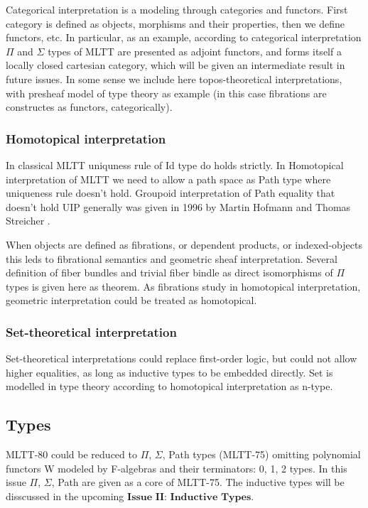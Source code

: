\documentclass{article}
\theoremstyle{definition}
\begin{document}
Categorical interpretation \cite{Curien14} is a modeling through categories and functors.
First category is defined as objects, morphisms and their properties, then
we define functors, etc. In particular, as an example, according to categorical
interpretation $\Pi$ and $\Sigma$ types of MLTT are presented as adjoint
functors, and forms itself a locally closed cartesian category, which will be given an
intermediate result in future issues. In some sense we include here
topos-theoretical interpretations, with presheaf model of type theory as
example (in this case fibrations are constructes as functors, categorically).

\subsubsection{Homotopical interpretation}

In classical MLTT uniquness rule of Id type do holds strictly. In Homotopical
interpretation of MLTT we need to allow a path space as Path type where uniqueness
rule doesn't hold. Groupoid interpretation of Path equality that doesn't hold UIP generally
was given in 1996 by Martin Hofmann and Thomas Streicher \cite{Hofmann96}.

When objects are defined as fibrations, or dependent products, or indexed-objects
this leds to fibrational semantics and geometric sheaf interpretation. Several definition
of fiber bundles and trivial fiber bindle as direct isomorphisms of $\Pi$ types is
given here as theorem. As fibrations study in homotopical interpretation, geometric
interpretation could be treated as homotopical.

\subsubsection{Set-theoretical interpretation}

Set-theoretical interpretations could replace first-order logic, but could not allow
higher equalities, as long as inductive types to be embedded directly. Set is modelled
in type theory according to homotopical interpretation as n-type.

\subsection{Types}

MLTT-80 could be reduced to $\Pi$, $\Sigma$, Path types (MLTT-75) omitting polynomial
functors W modeled by F-algebras and their terminators: 0, 1, 2 types.
In this issue $\Pi$, $\Sigma$, Path are given as a core of MLTT-75. The inductive types
will be disscussed in the upcoming $\textbf{Issue II: Inductive Types}$.
\end{document}
